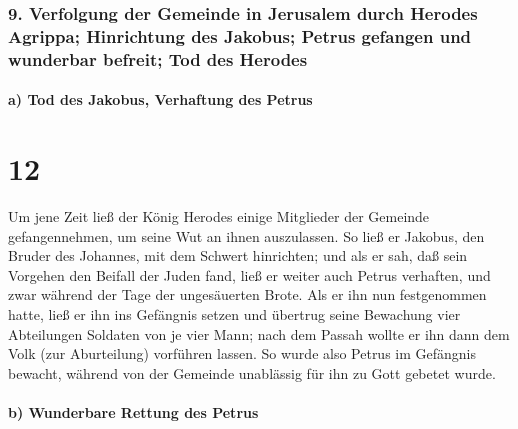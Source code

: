 \hypertarget{verfolgung-der-gemeinde-in-jerusalem-durch-herodes-agrippa-hinrichtung-des-jakobus-petrus-gefangen-und-wunderbar-befreit-tod-des-herodes}{%
\subsubsection{9. Verfolgung der Gemeinde in Jerusalem durch Herodes
Agrippa; Hinrichtung des Jakobus; Petrus gefangen und wunderbar befreit;
Tod des
Herodes}\label{verfolgung-der-gemeinde-in-jerusalem-durch-herodes-agrippa-hinrichtung-des-jakobus-petrus-gefangen-und-wunderbar-befreit-tod-des-herodes}}

\hypertarget{a-tod-des-jakobus-verhaftung-des-petrus}{%
\paragraph{a) Tod des Jakobus, Verhaftung des
Petrus}\label{a-tod-des-jakobus-verhaftung-des-petrus}}

\hypertarget{section-11}{%
\section{12}\label{section-11}}

 Um jene Zeit ließ der König Herodes einige Mitglieder der
Gemeinde gefangennehmen, um seine Wut an ihnen auszulassen.
 So ließ er Jakobus, den Bruder des Johannes, mit dem
Schwert hinrichten;  und als er sah, daß sein Vorgehen den
Beifall der Juden fand, ließ er weiter auch Petrus verhaften, und zwar
während der Tage der ungesäuerten Brote.  Als er ihn nun
festgenommen hatte, ließ er ihn ins Gefängnis setzen und übertrug seine
Bewachung vier Abteilungen Soldaten von je vier Mann; nach dem Passah
wollte er ihn dann dem Volk (zur Aburteilung) vorführen lassen.
 So wurde also Petrus im Gefängnis bewacht, während von
der Gemeinde unablässig für ihn zu Gott gebetet wurde.

\hypertarget{b-wunderbare-rettung-des-petrus}{%
\paragraph{b) Wunderbare Rettung des
Petrus}\label{b-wunderbare-rettung-des-petrus}}

